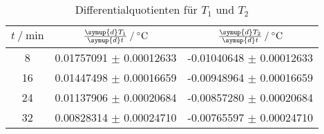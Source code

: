 \begin{table}
        \centering
        \label{tab:differentialquotienten}
        \begin{tabular}{c c c}
        \toprule
        $t \mathbin{/} \si{\minute} $ & $\frac{\symup{d}T_1}{\symup{d}t} \mathbin{/} \si{\celsius}$ & $\frac{\symup{d}T_2}{\symup{d}t} \mathbin{/} \si{\celsius}$ \\
        \midrule
        8  & 0.01757091 $\pm$ 0.00012633 & -0.01040648 $\pm$ 0.00012633 \\
        16 & 0.01447498 $\pm$ 0.00016659 & -0.00948964 $\pm$ 0.00016659 \\
        24 & 0.01137906 $\pm$ 0.00020684 & -0.00857280 $\pm$ 0.00020684 \\
        32 & 0.00828314 $\pm$ 0.00024710 & -0.00765597 $\pm$ 0.00024710 \\
        \bottomrule
        \end{tabular}
        \caption{Differentialquotienten für $T_1$ und $T_2$}
        \end{table}